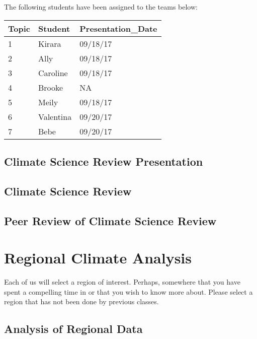 \documentclass{article}\usepackage[]{graphicx}\usepackage[]{color}
\begin{document}
The following students have been assigned to the teams below:

\begin{table}[ht]
\centering
\begin{tabular}{lll}
  \hline
Topic & Student & Presentation\_Date \\ 
  \hline
1 & Kirara & 09/18/17 \\ 
  2 & Ally & 09/18/17 \\ 
  3 & Caroline & 09/18/17 \\ 
  4 & Brooke & NA \\ 
  5 & Meily & 09/18/17 \\ 
  6 & Valentina & 09/20/17 \\ 
  7 & Bebe & 09/20/17 \\ 
   \hline
\end{tabular}
\end{table}


\subsection{Climate Science Review Presentation}



\subsection{Climate Science Review}



\subsection{Peer Review of Climate Science Review}



\section{Regional Climate Analysis}

Each of us will select a region of interest. Perhaps, somewhere that you have spent a compelling time in or that you wish to know more about. Please select a region that has not been done by previous classes. 

\subsection{Analysis of Regional Data}
\end{document}
